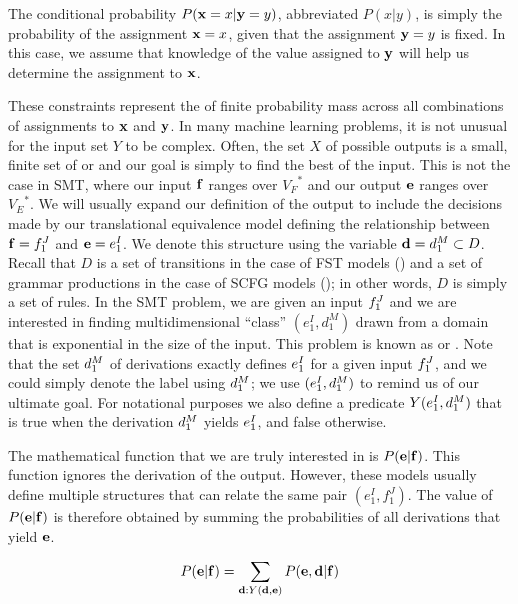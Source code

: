 \noindent The conditional probability
$P({\bf x}=x|{\bf y}=y)$, abbreviated $P(x|y)$, 
is simply the probability of the 
assignment ${\bf x}=x$, given that the assignment
${\bf y}=y$ is fixed. In this case, we assume that
knowledge of the value assigned to ${\bf y}$ will
help us determine the assignment to ${\bf x}$.

These constraints represent the 
 of finite probability mass 
across all combinations of assignments to ${\bf x}$ and ${\bf y}$.  
In many machine learning problems,
it is not unusual for the input set $Y$ to be
complex.  Often, the set $X$ of possible outputs 
is a small, finite set of  or 
and our goal is simply to find the best 
 of the input.
This is not the case in SMT, where our input
${\bf f}$ ranges over ${V_F}^*$ and our output ${\bf e}$ ranges
over ${V_E}^*$. We will usually expand our definition of
the output to include the decisions made by our
translational equivalence model defining the 
relationship between ${\bf f} = f_1^J$ and 
${\bf e} = e_1^I$.  We denote this structure
using the variable ${\bf d} = d_1^M \subset D$.
Recall that $D$ is a set of transitions in the 
case of FST models ()
and a set of grammar productions in the case of 
SCFG models (); in 
other words, $D$ is simply a set of rules. In the SMT
problem, we are given an input $f_1^J$ and we are
interested in finding multidimensional ``class'' $(e_1^I, d_1^M)$
drawn from a domain that is exponential in the size of the input.
This problem is known as 
or  \citep{Taskar:2004:thesis}.
Note that the set $d_1^M$ of derivations exactly defines
$e_1^I$ for a given input $f_1^J$, and we could simply
denote the label using $d_1^M$; we use
$(e_1^I,d_1^M)$ to remind us of our ultimate goal.  For
notational purposes we also
define a predicate $Y(e_1^I,d_1^M)$ that is true
when the derivation $d_1^M$ yields $e_1^I$, and false otherwise.

The mathematical function that we are truly interested
in is $P({\bf e}|{\bf f})$.  This function
ignores the derivation of the output.  However, these models usually
define multiple structures that
can relate the same pair $(e_1^I,f_1^J)$.  The value of 
$P({\bf e}|{\bf f})$ is therefore obtained by summing the probabilities
of all derivations that yield ${\bf e}$.

\begin{equation}
P({\bf e}|{\bf f}) = \sum_{{\bf d} : Y({\bf d},{\bf e})} P({\bf e},{\bf d}|{\bf f})
\end{equation}

